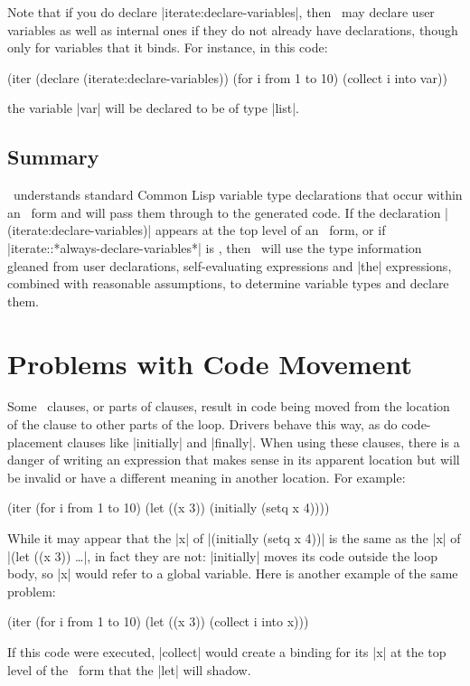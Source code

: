 Note that if you do declare |iterate:declare-variables|, then
\iter\ may declare user variables as well as internal ones if they do
not already have declarations, though only for variables that it
binds.  For instance, in this code:

\begin{program}
(iter (declare (iterate:declare-variables))
      (for i from 1 to 10)
      (collect i into var))
\end{program}
the variable |var| will be declared to be of type |list|.


\subsection{Summary}

\iter\ understands standard Common Lisp variable type declarations
that occur within an \iter\ form and
will pass them through to the generated code.  If the declaration
|(iterate:declare-variables)|
appears at the top level of an
\iter\ form, or if
|iterate::*always-declare-variables*|
is \nonnil, then \iter\ will use the type information gleaned from user
declarations, self-evaluating expressions and |the| expressions,
combined with reasonable assumptions, to determine variable
types and declare them.


\section{Problems with Code Movement}
\label{code-movement}

Some \iter\ clauses, or parts of clauses, result in code being
moved from the location of the clause to other parts of the loop.
Drivers behave this way, as do code-placement clauses like |initially|
and |finally|.  When using these clauses, there is a danger of writing
an expression that makes sense in its apparent location but will be
invalid or have a different meaning in another location.  For example:
\begin{program}
(iter (for i from 1 to 10)
      (let ((x 3))
        (initially (setq x 4))))
\end{program}
While it may appear that the |x| of |(initially (setq x 4))| is the
same as the |x| of |(let ((x 3)) \dots|, in fact they are not:
|initially| moves its code outside the loop body, so |x| would refer
to a global variable.  Here is another example of the same problem:
\begin{program}
(iter (for i from 1 to 10)
      (let ((x 3))
        (collect i into x)))
\end{program}
If this code were executed, |collect| would create a binding for its
|x| at the top level of the \iter\ form that the |let| will shadow.

